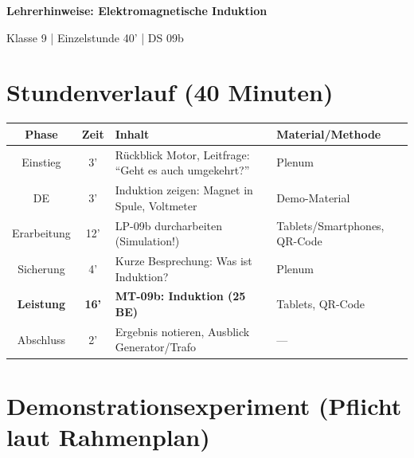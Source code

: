 \documentclass[a4paper,11pt]{article}
\begin{document}
{\Large\bfseries\color{physik}Lehrerhinweise: Elektromagnetische Induktion}

\vspace{2mm}
{\small Klasse 9 | Einzelstunde 40' | DS 09b}

\vspace{5mm}

\section*{Stundenverlauf (40 Minuten)}

\begin{tabularx}{\textwidth}{|c|c|X|X|}
\hline
\textbf{Phase} & \textbf{Zeit} & \textbf{Inhalt} & \textbf{Material/Methode} \\
\hline
Einstieg & 3' & Rückblick Motor, Leitfrage: ``Geht es auch umgekehrt?'' & Plenum \\
\hline
DE & 3' & Induktion zeigen: Magnet in Spule, Voltmeter & Demo-Material \\
\hline
Erarbeitung & 12' & LP-09b durcharbeiten (Simulation!) & Tablets/Smartphones, QR-Code \\
\hline
Sicherung & 4' & Kurze Besprechung: Was ist Induktion? & Plenum \\
\hline
\textbf{Leistung} & \textbf{16'} & \textbf{MT-09b: Induktion (25 BE)} & Tablets, QR-Code \\
\hline
Abschluss & 2' & Ergebnis notieren, Ausblick Generator/Trafo & --- \\
\hline
\end{tabularx}

\vspace{5mm}

\section*{Demonstrationsexperiment (Pflicht laut Rahmenplan)}
\end{document}
